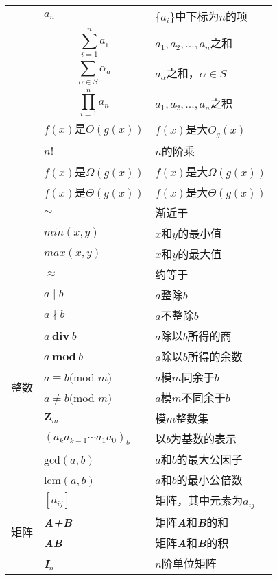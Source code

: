 \documentclass[UTF8]{ctexart}
\begin{document}
\begin{longtable}{|p{9em}|p{15em}|p{15em}|}
    & $a_n$ & $\{a_i\}$中下标为$n$的项 \\
  \cline{2-3}
    & $$\sum_{i=1}^na_i$$ & $a_1, a_2, ... , a_n$之和\\
  \cline{2-3}
    & $$\sum_{\alpha\in S}\alpha_a$$ & $a_\alpha$之和，$\alpha\in S$\\
  \cline{2-3}
    & $$\prod_{i=1}^na_n$$ & $a_1, a_2, ... , a_n$之积\\
  \cline{2-3}
    & $f(x)是O(g(x))$ & $f(x)$是大$O_g(x)$ \\
  \cline{2-3}
    & $n!$ & $n$的阶乘\\
  \cline{2-3}
    & $f(x)$是$\Omega(g(x))$ & $f(x)$是大$\Omega(g(x))$\\
  \cline{2-3}
    & $f(x)$是$\Theta(g(x))$ & $f(x)$是大$\Theta(g(x))$\\
  \cline{2-3}
    & $\sim$ & 渐近于\\
  \cline{2-3}
    & $min(x, y)$ & $x$和$y$的最小值 \\
  \cline{2-3}
    & $max(x, y)$ & $x$和$y$的最大值 \\
  \cline{2-3}
    & $\approx$ & 约等于\\
  \hline
  \multirow{10}{9em}{整数} & $a\mid b$ & $a$整除$b$\\
  \cline{2-3}
    & $a\nmid b$ & $a$不整除$b$\\
  \cline{2-3}
    & $a\ \mathbf{div}\ b$ & $a$除以$b$所得的商\\
  \cline{2-3}
    & $a\ \mathbf{mod}\ b$ & $a$除以$b$所得的余数\\
  \cline{2-3}
    & $a\equiv b($mod $m)$ & $a$模$m$同余于$b$\\
  \cline{2-3}
    & $a\ne b($mod $m)$ & $a$模$m$不同余于$b$\\
  \cline{2-3}
    & $\mathbf{Z}_m$& 模$m$整数集\\
  \cline{2-3}
    & $(a_ka_{k-1}\cdots a_1a_0)_b$& 以$b$为基数的表示\\
  \cline{2-3}
    & gcd$(a, b)$& $a$和$b$的最大公因子\\
  \cline{2-3}
    & lcm$(a, b)$& $a$和$b$的最小公倍数\\
  \hline
  \multirow{9}{9em}{矩阵} & $[a_{ij}]$ & 矩阵，其中元素为$a_{ij}$\\
  \cline{2-3}
    & \textbf{\textit{A+B}}& 矩阵\textbf{\textit{A}}和\textbf{\textit{B}}的和\\
  \cline{2-3}
    & \textbf{\textit{AB}}& 矩阵\textbf{\textit{A}}和\textbf{\textit{B}}的积\\
  \cline{2-3}
    & \textbf{\textit{I}}$_n$& $n$阶单位矩阵\\

\end{longtable}
\end{document}
